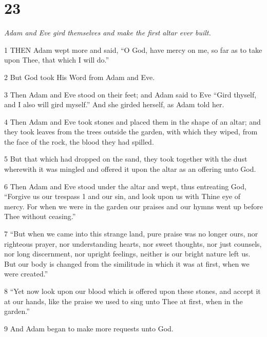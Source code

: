 \chapter{23}

\par \textit{Adam and Eve gird themselves and make the first altar ever built.}

\par 1 THEN Adam wept more and said, “O God, have mercy on me, so far as to take upon Thee, that which I will do.”

\par 2 But God took His Word from Adam and Eve.

\par 3 Then Adam and Eve stood on their feet; and Adam said to Eve “Gird thyself, and I also will gird myself.” And she girded herself, as Adam told her.

\par 4 Then Adam and Eve took stones and placed them in the shape of an altar; and they took leaves from the trees outside the garden, with which they wiped, from the face of the rock, the blood they had spilled.

\par 5 But that which had dropped on the sand, they took together with the dust wherewith it was mingled and offered it upon the altar as an offering unto God.

\par 6 Then Adam and Eve stood under the altar and wept, thus entreating God, “Forgive us our trespass 1 and our sin, and look upon us with Thine eye of mercy. For when we were in the garden our praises and our hymns went up before Thee without ceasing.”

\par 7 “But when we came into this strange land, pure praise was no longer ours, nor righteous prayer, nor understanding hearts, nor sweet thoughts, nor just counsels, nor long discernment, nor upright feelings, neither is our bright nature left us. But our body is changed from the similitude in which it was at first, when we were created.”

\par 8 “Yet now look upon our blood which is offered upon these stones, and accept it at our hands, like the praise we used to sing unto Thee at first, when in the garden.”

\par 9 And Adam began to make more requests unto God.


